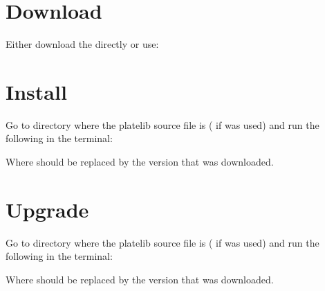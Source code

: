 \documentclass[letterpaper,10pt,english]{sphinxmanual}
\begin{document}
\section{Download}
\label{\detokenize{install:download}}\label{\detokenize{install:git}}
Either download the  directly or use:
\begin{quote}

\end{quote}


\section{Install}
\label{\detokenize{install:source-distribution}}\label{\detokenize{install:install}}
Go to directory where the platelib source file is ( if  was used) and run the following in the terminal:

%
\begin{sphinxVerbatim}[commandchars=\\\{\}]
  
\end{sphinxVerbatim}

Where  should be replaced by the version that was downloaded.


\section{Upgrade}
\label{\detokenize{install:upgrade}}
Go to directory where the platelib source file is ( if  was used) and run the following in the terminal:

%
\begin{sphinxVerbatim}[commandchars=\\\{\}]
   
\end{sphinxVerbatim}

Where  should be replaced by the version that was downloaded.
\end{document}
